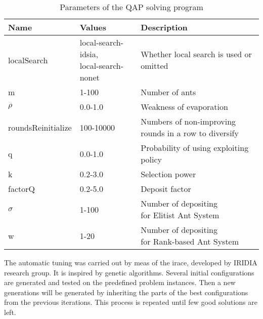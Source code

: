 \documentclass[12pt]{article}
\begin{document}
\begin{table}[H]
\centering
\caption{Parameters of the QAP solving program}
\label{tbl:parameters}
\begin{tabular}{|l|l|l|}
\hline
\textbf{Name}         & \textbf{Values}                       & \textbf{Description}                                  \\ \hline
localSearch           & \makecell{local-search-idsia,\\ local-search-nonet} & Whether local search is used or omitted               \\ \hline
m                     & 1-100                                 & Number of ants                                        \\ \hline
$\rho$   & 0.0-1.0                               & Weakness of evaporation                               \\ \hline
roundsReinitialize    & 100-10000                             & \makecell[l]{Numbers of non-improving \\rounds in a row to diversify} \\ \hline
q                     & 0.0-1.0                               & Probability of using exploiting policy                \\ \hline
k                     & 0.2-3.0                               & Selection power                                       \\ \hline
factorQ               & 0.2-5.0                               & Deposit factor                                        \\ \hline
$\sigma$ & 1-100                                 & \makecell[l]{Number of depositing \\for Elitist Ant System}           \\ \hline
w                     & 1-20                                  & \makecell[l]{Number of depositing \\for Rank-based Ant System}        \\ \hline
\end{tabular}
\end{table}

The automatic tuning was carried out by meas of the irace, developed by IRIDIA research group. It is inspired by genetic algorithms. Several initial configurations are generated and tested on the predefined problem instances. Then a new generations will be generated by inheriting the parts of the best configurations from the previous iterations. This process is repeated until few good solutions are left.
\end{document}
